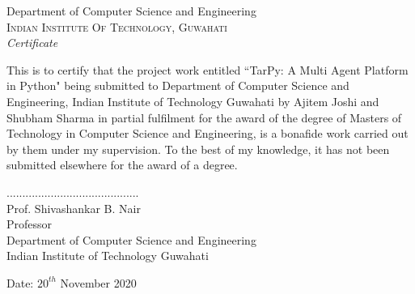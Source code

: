 \newpage
\thispagestyle{empty}

\begin{center}

\huge{Department of Computer Science and Engineering}\\[0.5cm]
\normalsize
\textsc{Indian Institute Of Technology, Guwahati}\\[2.0cm]

\emph{\LARGE Certificate}\\[2.5cm]
\end{center}
\normalsize This is to certify that the project work entitled ``TarPy:  A Multi Agent Platform in Python" being submitted to Department of Computer Science and Engineering, Indian Institute of Technology Guwahati by Ajitem Joshi and Shubham Sharma in partial fulfilment for the award of the degree of Masters of Technology in Computer Science and Engineering, is a bonafide work carried out by them under my supervision. To the best of my knowledge, it has not been submitted elsewhere for the award of a degree.\\[1.0cm]



\vfill


\begin{flushright}
..........................................\\
Prof. Shivashankar B. Nair\\
Professor\\
Department of Computer Science and Engineering\\
Indian Institute of Technology Guwahati
\end{flushright}

\begin{flushleft}
Date: $20^{th}$ November 2020
\end{flushleft}